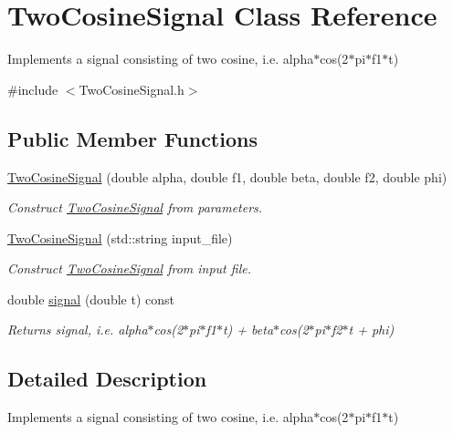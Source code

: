 \hypertarget{classTwoCosineSignal}{}\section{Two\+Cosine\+Signal Class Reference}
\label{classTwoCosineSignal}


Implements a signal consisting of two cosine, i.\+e. alpha$\ast$cos(2$\ast$pi$\ast$f1$\ast$t)  




{\ttfamily \#include $<$Two\+Cosine\+Signal.\+h$>$}

\subsection*{Public Member Functions}
\begin{DoxyCompactItemize}
\item 
\hyperlink{classTwoCosineSignal_a0a4302be17fc5c01dacdbee1939ef565}{Two\+Cosine\+Signal} (double alpha, double f1, double beta, double f2, double phi)
\begin{DoxyCompactList}\small\item\em Construct \hyperlink{classTwoCosineSignal}{Two\+Cosine\+Signal} from parameters. \end{DoxyCompactList}\item 
\hyperlink{classTwoCosineSignal_a524fe84e94bb65d15343109f75ca5ef8}{Two\+Cosine\+Signal} (std\+::string input\+\_\+file)
\begin{DoxyCompactList}\small\item\em Construct \hyperlink{classTwoCosineSignal}{Two\+Cosine\+Signal} from input file. \end{DoxyCompactList}\item 
double \hyperlink{classTwoCosineSignal_a1129875198d637d80db6f083a207a3ba}{signal} (double t) const
\begin{DoxyCompactList}\small\item\em Returns signal, i.\+e. alpha$\ast$cos(2$\ast$pi$\ast$f1$\ast$t) + beta$\ast$cos(2$\ast$pi$\ast$f2$\ast$t + phi) \end{DoxyCompactList}\end{DoxyCompactItemize}


\subsection{Detailed Description}
Implements a signal consisting of two cosine, i.\+e. alpha$\ast$cos(2$\ast$pi$\ast$f1$\ast$t) 


